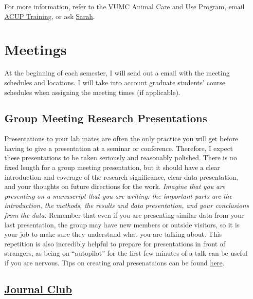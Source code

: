 \documentclass[
]{book}
\begin{document}
For more information, refer to the \href{https://www.vumc.org/acup/welcome}{VUMC Animal Care and Use Program}, email \href{mailto:\%20acuptraining@vumc.org}{ACUP Training}, or ask \href{mailto:sarah.m.sturgeon@Vanderbilt.Edu}{Sarah}.

\hypertarget{meetings}{%
\chapter{Meetings}\label{meetings}}

At the beginning of each semester, I will send out a email with the meeting schedules and locations. I will take into account graduate students' course schedules when assigning the meeting times (if applicable).

\hypertarget{group-meeting-research-presentations}{%
\section{Group Meeting Research Presentations}\label{group-meeting-research-presentations}}

Presentations to your lab mates are often the only practice you will get before having to give a presentation at a seminar or conference. Therefore, I expect these presentations to be taken seriously and reasonably polished. There is no fixed length for a group meeting presentation, but it should have a clear introduction and coverage of the research significance, clear data presentation, and your thoughts on future directions for the work. \emph{Imagine that you are presenting on a manuscript that you are writing: the important parts are the introduction, the methods, the results and data presentation, and your conclusions from the data.} Remember that even if you are presenting similar data from your last presentation, the group may have new members or outside visitors, so it is your job to make sure they understand what you are talking about. This repetition is also incredibly helpful to prepare for presentations in front of strangers, as being on ``autopilot'' for the first few minutes of a talk can be useful if you are nervous. Tips on creating oral presenataions can be found \protect\hyperlink{oralpres}{here}.

\hypertarget{journal-club}{%
\section{\texorpdfstring{\protect\hyperlink{journalclub}{Journal Club}}{Journal Club}}\label{journal-club}}
\end{document}
